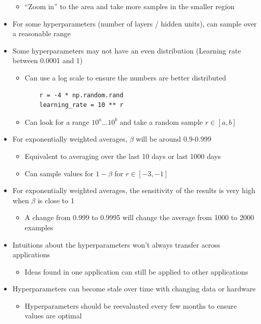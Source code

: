 \documentclass[12pt, letterpaper]{article}
\begin{document}
\begin{itemize}
\begin{itemize}
            \item ``Zoom in'' to the area and take more samples in the smaller region
        \end{itemize}
        \item For some hyperparameters (number of layers / hidden units), can sample over a reasonable range 
        \item Some hyperparameters may not have an even distribution (Learning rate between 0.0001 and 1)
        \begin{itemize}
            \item Can use a log scale to ensure the numbers are better distributed 
            \begin{verbatim}
    r = -4 * np.random.rand
    learning_rate = 10 ** r
            \end{verbatim}
            \item Can look for a range $10^a ... 10^b$ and take a random sample $r\in[a,b]$
        \end{itemize}
        \item For exponentially weighted averages, $\beta$ will be around 0.9-0.999
        \begin{itemize}
            \item Equivalent to averaging over the last 10 days or last 1000 days
            \item Can sample values for $1-\beta$ for $r\in[-3,-1]$
        \end{itemize}
        \item For exponentially weighted averages, the sensitivity of the results is very high when $\beta$ is close to 1
        \begin{itemize}
            \item A change from 0.999 to 0.9995 will change the average from 1000 to 2000 examples
        \end{itemize}  
        \item Intuitions about the hyperparameters won't always transfer across applications
        \begin{itemize}
            \item Ideas found in one application can still be applied to other applications
        \end{itemize} 
        \item Hyperparameters can become stale over time with changing data or hardware
        \begin{itemize}
            \item Hyperparameters should be reevaluated every few months to ensure values are optimal

\end{itemize}
\end{itemize}
\end{document}

